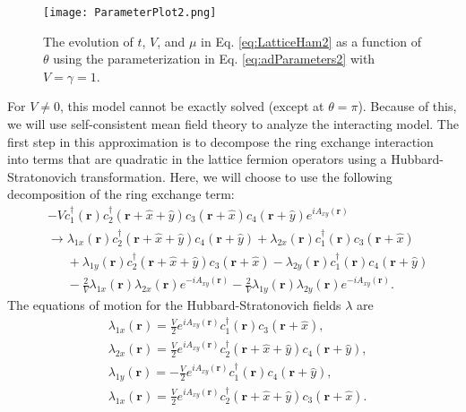 \documentclass[prb,aps,twocolumn,groupaddress,floatfix]{revtex4-1}
\begin{document}
\begin{figure}
\texttt{[image: ParameterPlot2.png]}
\caption{The evolution of $t$, $V$, and $\mu$ in Eq. \ref{eq:LatticeHam2} as a function of $\theta$ using the parameterization in Eq. \ref{eq:adParameters2} with $V = \gamma = 1$.}\label{fig:parameterplot2}
\end{figure}


For $V\neq 0$, this model cannot be exactly solved (except at $\theta = \pi$). Because of this, we will use self-consistent mean field theory to analyze the interacting model. The first step in this approximation is to decompose the ring exchange interaction into terms that are quadratic in the lattice fermion operators using a Hubbard-Stratonovich transformation. Here, we will choose to use the following decomposition of the ring exchange term:
\begin{equation}
\begin{split}
&-V c_1^\dagger(\bm{r})c_2^\dagger(\bm{r}+\hat{x}+\hat{y})c_3(\bm{r}+\hat{x})c_4(\bm{r}+\hat{y})e^{iA_{xy}(\bm{r})} \\ &\rightarrow \lambda_{1x}(\bm{r})c_2^\dagger(\bm{r}+\hat{x}+\hat{y})c_4(\bm{r}+\hat{y}) + \lambda_{2x}(\bm{r}) c_1^\dagger(\bm{r})c_3(\bm{r}+\hat{x}) \\&\phantom{\rightarrow}+\lambda_{1y}(\bm{r})c_2^\dagger(\bm{r}+\hat{x}+\hat{y})c_3(\bm{r}+\hat{x})- \lambda_{2y}(\bm{r})c_1^\dagger(\bm{r})c_4(\bm{r}+\hat{y})\\ &\phantom{\rightarrow}- \frac{2}{V}\lambda_{1x}(\bm{r})\lambda_{2x}(\bm{r})e^{-iA_{xy}(\bm{r})} - \frac{2}{V}\lambda_{1y}(\bm{r})\lambda_{2y}(\bm{r})e^{-iA_{xy}(\bm{r})}. 
\end{split}\label{eq:LatticeHS}
\end{equation}
The equations of motion for the Hubbard-Stratonovich fields $\lambda$ are
\begin{equation}
\begin{split}
&\lambda_{1x}(\bm{r}) = \frac{V}{2}e^{iA_{xy}(\bm{r})} c_1^\dagger(\bm{r})c_3(\bm{r}+\hat{x}), \\
&\lambda_{2x}(\bm{r}) = \frac{V}{2}e^{iA_{xy}(\bm{r})} c_2^\dagger(\bm{r}+\hat{x}+\hat{y})c_4(\bm{r}+\hat{y}), \\
&\lambda_{1y}(\bm{r}) = -\frac{V}{2}e^{iA_{xy}(\bm{r})} c_1^\dagger(\bm{r})c_4(\bm{r}+\hat{y}), \\
&\lambda_{1x}(\bm{r}) = \frac{V}{2}e^{iA_{xy}(\bm{r})} c_2^\dagger(\bm{r}+\hat{x}+\hat{y})c_3(\bm{r}+\hat{x}).
\end{split}\label{eq:HSEqOM}
\end{equation}
\end{document}
